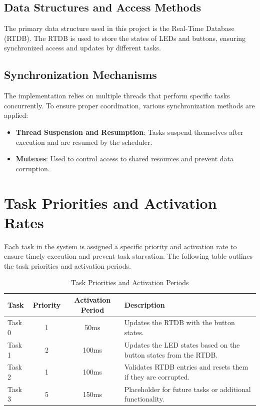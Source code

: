 \documentclass[a4paper,12pt]{article}
\begin{document}
\subsection{Data Structures and Access Methods}
The primary data structure used in this project is the Real-Time Database (RTDB). The RTDB is used to store the states of LEDs and buttons, ensuring synchronized access and updates by different tasks.

\subsection{Synchronization Mechanisms}
The implementation relies on multiple threads that perform specific tasks concurrently. To ensure proper coordination, various synchronization methods are applied:
\begin{itemize}
    \item \textbf{Thread Suspension and Resumption}: Tasks suspend themselves after execution and are resumed by the scheduler.
    \item \textbf{Mutexes}: Used to control access to shared resources and prevent data corruption.
\end{itemize}

\section{Task Priorities and Activation Rates}
Each task in the system is assigned a specific priority and activation rate to ensure timely execution and prevent task starvation. The following table outlines the task priorities and activation periods.

\begin{table}[H]
    \centering
    \begin{tabular}{|l|c|c|p{5cm}|}
        \hline
        \textbf{Task} & \textbf{Priority} & \textbf{Activation Period} & \textbf{Description} \\
        \hline
        Task 0 & 1 & 50ms & Updates the RTDB with the button states. \\
        \hline
        Task 1 & 2 & 100ms & Updates the LED states based on the button states from the RTDB. \\
        \hline
        Task 2 & 1 & 100ms & Validates RTDB entries and resets them if they are corrupted. \\
        \hline
        Task 3 & 5 & 150ms & Placeholder for future tasks or additional functionality. \\
        \hline
    \end{tabular}
    \caption{Task Priorities and Activation Periods}
    \label{tab:task_priorities}
\end{table}
\end{document}
